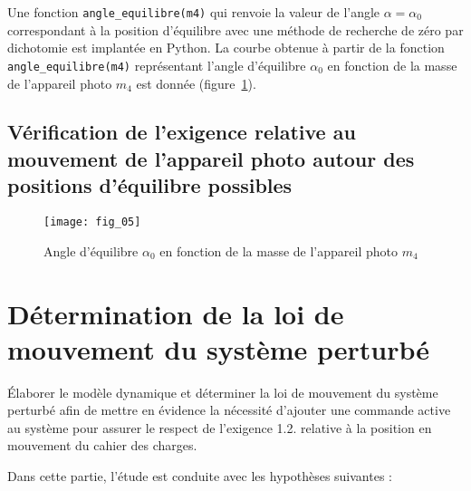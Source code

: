 Une fonction \texttt{angle\_equilibre(m4)} qui renvoie la valeur de l'angle $\alpha=\alpha_{0}$ correspondant à la position d'équilibre avec une méthode de recherche de zéro par dichotomie est implantée en Python. La courbe obtenue à partir de la fonction \texttt{angle\_equilibre(m4)} représentant l'angle d'équilibre $\alpha_{0}$ en fonction de la masse de l'appareil photo $m_{4}$ est donnée (figure~\ref{fig:05}).

\ifprof
\begin{corrige}
\end{corrige}
\else
\fi

\subsection{Vérification de l'exigence relative au mouvement de l'appareil photo autour des positions d'équilibre possibles}
\ifprof
\begin{corrige}
\end{corrige}
\else
\fi

\begin{figure}[H]
\centering
\texttt{[image: fig\_05]}
\caption{\label{fig:05} Angle d'équilibre $\alpha_{0}$ en fonction de la masse de l'appareil photo $m_{4}$}
\end{figure}



\section{\label{part:3}Détermination de la loi de mouvement du système perturbé }
\begin{obj}
Élaborer le modèle dynamique et déterminer la loi de mouvement du système perturbé afin de mettre en évidence la nécessité d'ajouter une commande active au système pour assurer le respect de l'exigence 1.2. relative à la position en mouvement du cahier des charges.
\end{obj}

Dans cette partie, l'étude est conduite avec les hypothèses suivantes :

